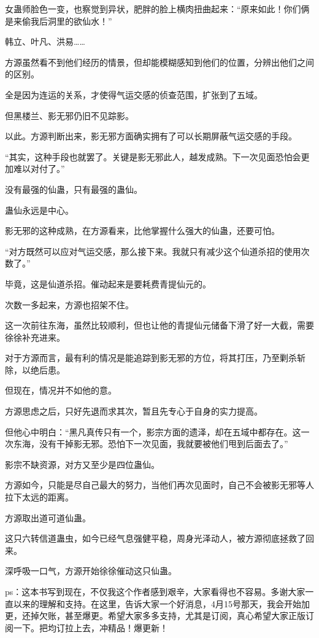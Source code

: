 \begin{this_body}
女蛊师脸色一变，也察觉到异状，肥胖的脸上横肉扭曲起来：“原来如此！你们俩是来偷我后洞里的欲仙水！”

韩立、叶凡、洪易……

方源虽然看不到他们经历的情景，但却能模糊感知到他们的位置，分辨出他们之间的区别。

全是因为连运的关系，才使得气运交感的侦查范围，扩张到了五域。

但黑楼兰、影无邪仍旧不见踪影。

以此。方源判断出来，影无邪方面确实拥有了可以长期屏蔽气运交感的手段。

“其实，这种手段也就罢了。关键是影无邪此人，越发成熟。下一次见面恐怕会更加难以对付了。”

没有最强的仙蛊，只有最强的蛊仙。

蛊仙永远是中心。

影无邪的这种成熟，在方源看来，比他掌握什么强大的仙蛊，还要可怕。

“对方既然可以应对气运交感，那么接下来。我就只有减少这个仙道杀招的使用次数了。”

毕竟，这是仙道杀招。催动起来是要耗费青提仙元的。

次数一多起来，方源也招架不住。

这一次前往东海，虽然比较顺利，但也让他的青提仙元储备下滑了好一大截，需要徐徐补充进来。

对于方源而言，最有利的情况是能追踪到影无邪的方位，将其打压，乃至剿杀斩除，以绝后患。

但现在，情况并不如他的意。

方源思虑之后，只好先退而求其次，暂且先专心于自身的实力提高。

但他心中明白：“黑凡真传只有一个，影宗方面的遗泽，却在五域中都存在。这一次东海，没有干掉影无邪。恐怕下一次见面，我就要被他们甩到后面去了。”

影宗不缺资源，对方又至少是四位蛊仙。

方源如今，只能是尽自己最大的努力，当他们再次见面时，自己不会被影无邪等人拉下太远的距离。

方源取出道可道仙蛊。

这只六转信道蛊虫，如今已经气息强健平稳，周身光泽动人，被方源彻底拯救了回来。

深呼吸一口气，方源开始徐徐催动这只仙蛊。

ps：这本书写到现在，不仅我这个作者感到艰辛，大家看得也不容易。多谢大家一直以来的理解和支持。在这里，告诉大家一个好消息，4月15号那天，我会开始加更，还掉欠账，甚至爆更。希望大家多多支持，尤其是订阅，真心希望大家正版订阅一下。把均订拉上去，冲精品！爆更新！

\end{this_body}

